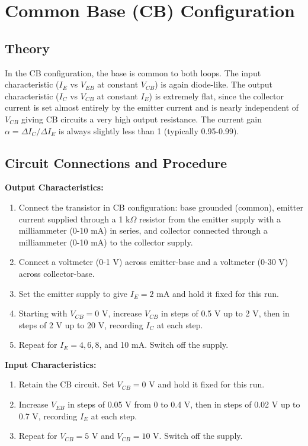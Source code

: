 \documentclass[12pt,a4paper]{article}
\begin{document}
 
\section{Common Base (CB) Configuration}

\subsection{Theory}
In the CB configuration, the base is common to both loops. The input characteristic ($I_E$ vs $V_{EB}$ at constant $V_{CB}$) is again diode-like. The output characteristic ($I_C$ vs $V_{CB}$ at constant $I_E$) is extremely flat, since the collector current is set almost entirely by the emitter current and is nearly independent of $V_{CB}$ giving CB circuits a very high output resistance. The current gain $\alpha=\Delta I_C/\Delta I_E$ is always slightly less than 1 (typically 0.95-0.99).

\subsection{Circuit Connections and Procedure}
\textbf{Output Characteristics:}
\begin{enumerate}
    \item Connect the transistor in CB configuration: base grounded (common), emitter current supplied through a 1 k$\Omega$ resistor from the emitter supply with a milliammeter (0-10 mA) in series, and collector connected through a milliammeter (0-10 mA) to the collector supply.
    \item Connect a voltmeter (0-1 V) across emitter-base and a voltmeter (0-30 V) across collector-base.
    \item Set the emitter supply to give $I_E=2$ mA and hold it fixed for this run.
    \item Starting with $V_{CB}=0$ V, increase $V_{CB}$ in steps of 0.5 V up to 2 V, then in steps of 2 V up to 20 V, recording $I_C$ at each step.
    \item Repeat for $I_E=4, 6, 8$, and 10 mA. Switch off the supply.
\end{enumerate}

\textbf{Input Characteristics:}
\begin{enumerate}
    \item Retain the CB circuit. Set $V_{CB} = 0$ V and hold it fixed for this run.
    \item Increase $V_{EB}$ in steps of 0.05 V from 0 to 0.4 V, then in steps of 0.02 V up to 0.7 V, recording $I_E$ at each step.
    \item Repeat for $V_{CB}=5$ V and $V_{CB}=10$ V. Switch off the supply.
\end{enumerate}
\end{document}
